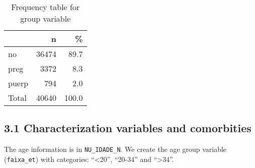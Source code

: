 \documentclass[
]{article}
\newenvironment{Shaded}{\begin{snugshade}}{\end{snugshade}}
\newcommand{\CommentTok}[1]{\textcolor[rgb]{0.56,0.35,0.01}{\textit{#1}}}
\newcommand{\DataTypeTok}[1]{\textcolor[rgb]{0.13,0.29,0.53}{#1}}
\newcommand{\DecValTok}[1]{\textcolor[rgb]{0.00,0.00,0.81}{#1}}
\newcommand{\KeywordTok}[1]{\textcolor[rgb]{0.13,0.29,0.53}{\textbf{#1}}}
\newcommand{\NormalTok}[1]{#1}
\newcommand{\OperatorTok}[1]{\textcolor[rgb]{0.81,0.36,0.00}{\textbf{#1}}}
\newcommand{\StringTok}[1]{\textcolor[rgb]{0.31,0.60,0.02}{#1}}
\begin{document}
\begin{table}[!h]

\caption{\label{tab:unnamed-chunk-15}Frequency table for group variable}
\centering
\begin{tabular}[t]{l|r|r}
\hline
  & n & \%\\
\hline
no & 36474 & 89.7\\
\hline
preg & 3372 & 8.3\\
\hline
puerp & 794 & 2.0\\
\hline
Total & 40640 & 100.0\\
\hline
\end{tabular}
\end{table}

\hypertarget{characterization-variables-and-comorbities}{%
\subsection{3.1 Characterization variables and
comorbities}\label{characterization-variables-and-comorbities}}

The age information is in \texttt{NU\_IDADE\_N}. We create the age group
variable (\texttt{faixa\_et}) with categories: ``\textless20'',
``20-34'' and ``\textgreater34''.

\begin{Shaded}
\end{Shaded}
\end{document}
